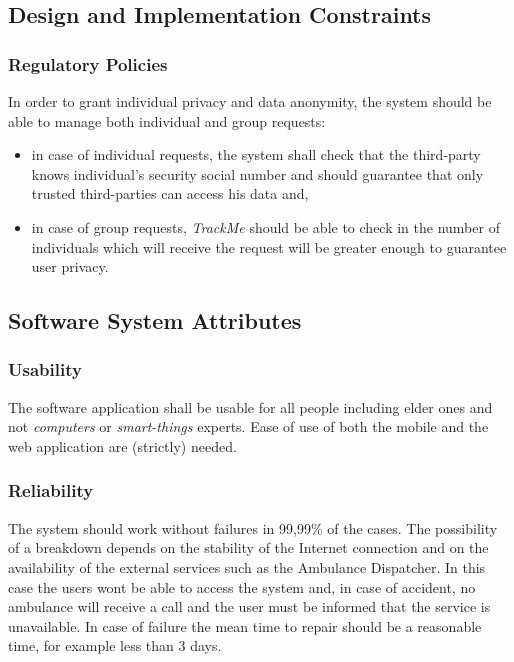 \documentclass[a4paper]{article}
\begin{document}
        \newpage
        
        \subsection{Design and Implementation Constraints}
    
        \subsubsection{Regulatory Policies}
        In order to grant individual privacy and data anonymity, the system should be able to manage both individual and group requests:
        \begin{itemize}
            \item in case of individual requests, the system shall check that the third-party knows individual's security social number and should guarantee that only trusted third-parties can access his data and,
            \item in case of group requests, \textit{TrackMe} should be able to check in the number of individuals which will receive the request will be greater enough to guarantee user privacy.
        \end{itemize}
        
        \subsection{Software System Attributes}
        \subsubsection{Usability}
        The software application shall be usable for all people including elder ones and not \textit{computers} or \textit{smart-things} experts. Ease of use of both the mobile and the web application are (strictly) needed.
        
        \subsubsection{Reliability}
        The system should work without failures in 99,99\% of the cases. The possibility of a breakdown depends on the stability of the Internet connection and on the availability of the external services such as the Ambulance Dispatcher. In this case the users wont be able to access the system and, in case of accident, no ambulance will receive a call and the user must be informed that the service is unavailable. In case of failure the mean time to repair should be a reasonable time, for example less than 3 days.
       
\end{document}
